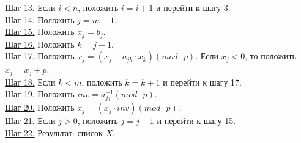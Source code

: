 \documentclass[bachelor, och, labwork]{shiza}
\begin{document}
            \underline{Шаг 13.} Если $i < n$, положить $i = i + 1$ и перейти к
            шагу 3.\\
            \underline{Шаг 14.} Положить $j = m - 1$.\\
            \underline{Шаг 15.} Положить $x_j = b_j$.\\
            \underline{Шаг 16.} Положить $k = j + 1$.\\
            \underline{Шаг 17.} Положить $x_j = (x_j - a_{jk} \cdot x_k) (mod
            \text{ } p)$. Если $x_j < 0$, то положить $x_j = x_j + p$.\\
            \underline{Шаг 18.} Если $k < m$, положить $k = k + 1$ и перейти к
            шагу 17.\\
            \underline{Шаг 19.} Положить $inv = a_{jj}^{-1} (mod \text{ } p)$.\\
            \underline{Шаг 20.} Положить $x_j = (x_j \cdot inv) (mod \text{ }
            p)$.\\
            \underline{Шаг 21.} Если $j > 0$, положить $j = j - 1$ и перейти к
            шагу 15.\\
            \underline{Шаг 22.} Результат: список $X$.
\end{document}
